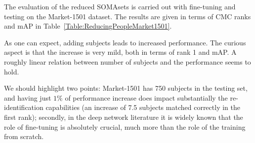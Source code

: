 \documentclass[10pt,journal,letterpaper,compsoc]{IEEEtran}
\begin{document}
The evaluation of the reduced SOMAsets is carried out with fine-tuning and testing on the Market-1501 dataset. The results are given in terms of CMC ranks and mAP in Table~\ref{Table:ReducingPeopleMarket1501}.




\begin{table}[!htbp]
\scriptsize
	\centering
	\caption{Analysis of the role of the \emph{size} of SOMAset as training data. Here SOMAset was rendered in original and reduced versions by \emph{changing the number of rendered subjects}. The different versions of SOMAset were fine-tuned with the training partition of the Market-1501 dataset, and tested on the test partition of the same dataset.}
\end{table}

As one can expect, adding subjects leads to increased performance. The curious aspect is that the increase is very mild, both in terms of rank 1 and mAP. A roughly linear relation between number of subjects and the performance seems to hold. %


We should highlight two points: Market-1501 has 750 subjects in the testing set, and having just $1\%$ of performance increase does impact substantially the re-identification capabilities (an increase of 7.5 subjects matched correctly in the first rank); secondly, in the deep network literature it is widely known that the role of fine-tuning is absolutely crucial, much more than the role of the training from scratch. 
\end{document}
